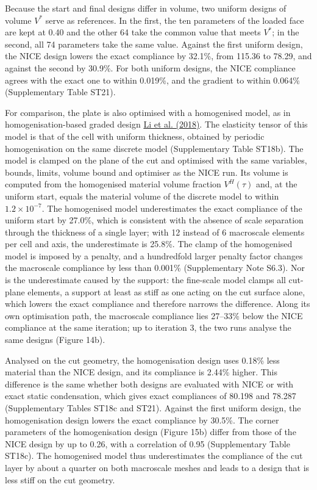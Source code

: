 \documentclass[preprint,12pt,authoryear]{elsarticle}
\begin{document}
Because the start and final designs differ in volume, two uniform designs of volume \(V^*\) serve as references. In the first, the ten parameters of the loaded face are kept at 0.40 and the other 64 take the common value that meets \(V^*\); in the second, all 74 parameters take the same value. Against the first uniform design, the NICE design lowers the exact compliance by 32.1\%, from 115.36 to 78.29, and against the second by 30.9\%. For both uniform designs, the NICE compliance agrees with the exact one to within 0.019\%, and the gradient to within 0.064\% (Supplementary Table ST21).

For comparison, the plate is also optimised with a homogenised model, as in homogenisation-based graded design \href{https://doi.org/10.1016/j.cad.2018.06.003}{Li et al. (2018)}. The elasticity tensor of this model is that of the cell with uniform thickness, obtained by periodic homogenisation on the same discrete model (Supplementary Table ST18b). The model is clamped on the plane of the cut and optimised with the same variables, bounds, limits, volume bound and optimiser as the NICE run. Its volume is computed from the homogenised material volume fraction \(V^H(\tau)\) and, at the uniform start, equals the material volume of the discrete model to within \(1.2\times10^{-7}\). The homogenised model underestimates the exact compliance of the uniform start by 27.0\%, which is consistent with the absence of scale separation through the thickness of a single layer; with 12 instead of 6 macroscale elements per cell and axis, the underestimate is 25.8\%. The clamp of the homogenised model is imposed by a penalty, and a hundredfold larger penalty factor changes the macroscale compliance by less than 0.001\% (Supplementary Note S6.3). Nor is the underestimate caused by the support: the fine-scale model clamps all cut-plane elements, a support at least as stiff as one acting on the cut surface alone, which lowers the exact compliance and therefore narrows the difference. Along its own optimisation path, the macroscale compliance lies 27--33\% below the NICE compliance at the same iteration; up to iteration 3, the two runs analyse the same designs (Figure 14b).

Analysed on the cut geometry, the homogenisation design uses 0.18\% less material than the NICE design, and its compliance is 2.44\% higher. This difference is the same whether both designs are evaluated with NICE or with exact static condensation, which gives exact compliances of 80.198 and 78.287 (Supplementary Tables ST18c and ST21). Against the first uniform design, the homogenisation design lowers the exact compliance by 30.5\%. The corner parameters of the homogenisation design (Figure 15b) differ from those of the NICE design by up to 0.26, with a correlation of 0.95 (Supplementary Table ST18c). The homogenised model thus underestimates the compliance of the cut layer by about a quarter on both macroscale meshes and leads to a design that is less stiff on the cut geometry.
\end{document}
